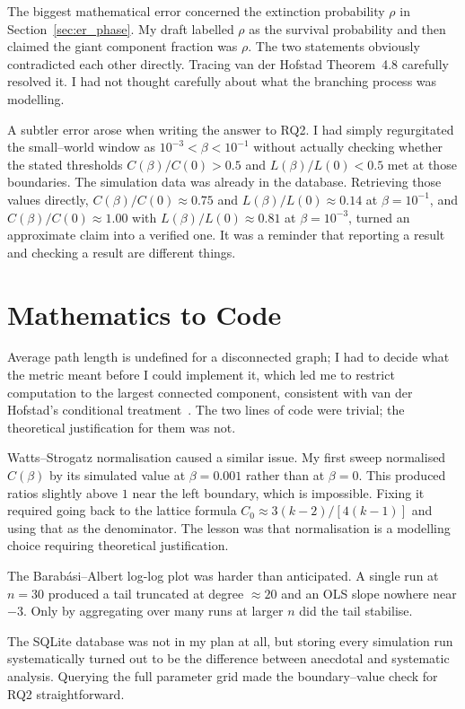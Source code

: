 \documentclass[12pt, a4paper]{report}
\theoremstyle{definition}
\theoremstyle{plain}
\theoremstyle{remark}
\begin{document}
The biggest mathematical error concerned the extinction probability
$\rho$ in Section~\ref{sec:er_phase}. My draft labelled $\rho$ as the
survival probability and then claimed the giant component fraction was $\rho$.
The two statements obviously contradicted each other directly. Tracing van der
Hofstad Theorem~4.8 carefully resolved it. I had not thought carefully
about what the branching process was modelling.

A subtler error arose when writing the answer to RQ2. I had simply regurgitated the
small--world window as $10^{-3} < \beta < 10^{-1}$ without actually checking
whether the stated thresholds $C(\beta)/C(0) > 0.5$ and $L(\beta)/L(0) < 0.5$
met at those boundaries. The simulation data was already in the database.
Retrieving those values directly, $C(\beta)/C(0) \approx 0.75$ and $L(\beta)/L(0) \approx 0.14$ at
$\beta = 10^{-1}$, and $C(\beta)/C(0) \approx 1.00$ with $L(\beta)/L(0)
\approx 0.81$ at $\beta = 10^{-3}$, turned an approximate claim into a
verified one. It was a reminder that reporting a result and checking
a result are different things.

\section*{Mathematics to Code}

Average path length is
undefined for a disconnected graph; I had to decide what the metric
meant before I could implement it, which led me to restrict computation
to the largest connected component, consistent with van der Hofstad's
conditional treatment~\cite{hofstad2017}. The two lines of code were trivial;
the theoretical justification for them was not.

Watts--Strogatz normalisation caused a similar issue. My first sweep
normalised $C(\beta)$ by its simulated value at $\beta = 0.001$ rather than
at $\beta = 0$. This produced ratios slightly above $1$ near the left boundary,
which is impossible. Fixing it required going back to the lattice formula
$C_0 \approx 3(k-2)/[4(k-1)]$ and using that as the denominator. The lesson
was that normalisation is a modelling choice requiring theoretical
justification.

The Barab\'asi--Albert log-log plot was harder than anticipated. A single run
at $n = 30$ produced a tail truncated at degree $\approx 20$ and an OLS
slope nowhere near $-3$. Only by aggregating over many runs at larger $n$ did
the tail stabilise.

The SQLite database was not in my plan at all, but storing every simulation
run systematically turned out to be the difference between anecdotal and
systematic analysis. Querying the full parameter grid made the boundary--value
check for RQ2 straightforward.
\end{document}
